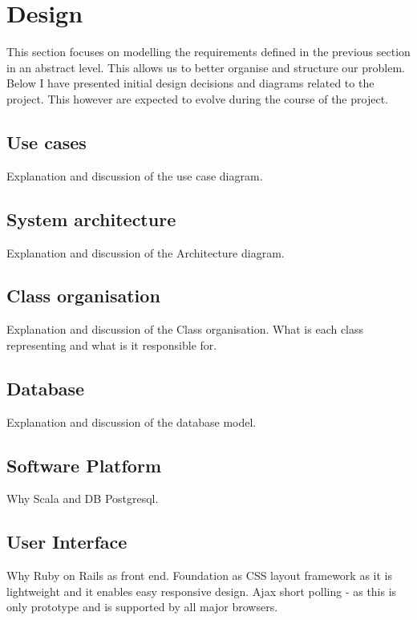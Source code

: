 \chapter{Design}
This section focuses on modelling the requirements defined in the previous
section in an abstract level. This allows us to better organise and structure
our problem. Below I have presented initial design decisions and diagrams
related to the project. This however are expected to evolve during the course
of the project.

\section{Use cases}
Explanation and discussion of the use case diagram.

\section{System architecture}
Explanation and discussion of the Architecture diagram.

\section{Class organisation}
Explanation and discussion of the Class organisation. What is each class representing and what is it responsible for.

\section{Database}
Explanation and discussion of the database model.

\section{Software Platform}
Why Scala and DB Postgresql. 

\section{User Interface}
Why Ruby on Rails as front end. Foundation as CSS layout framework as it is lightweight and it enables easy responsive design.
Ajax short polling - as this is only prototype and is supported by all major browsers.